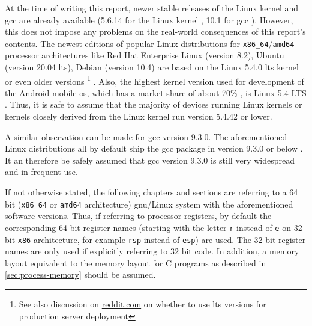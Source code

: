 At the time of writing this report, newer stable releases of the Linux kernel and \gls{gcc} are already available (5.6.14 for the Linux kernel \cite{LKO2020a}, 10.1 for \gls{gcc} \cite{FSF2020}).
However, this does not impose any problems on the real-world consequences of this report's contents.
The newest editions of popular Linux distributions for \texttt{x86\_64}/\texttt{amd64} processor architectures like Red Hat Enterprise Linux (version 8.2), Ubuntu (version 20.04 \gls{lts}), Debian (version 10.4) are based on the Linux 5.4.0 \gls{lts} kernel or even older versions%
	\footnote{See also discussion on \href{https://www.reddit.com/r/webhosting/comments/beg0z0/should_i_use_an_lts_version_of_ubuntu_for_my_web/}{reddit.com} on whether to use \gls{lts} versions for production server deployment}
\cite{RedHat2020,Canonical2020,SPI2020,SPI2020a}.
Also, the highest kernel version used for development of the Android mobile \gls{os}, which has a market share of about 70\% \cite{Statcounter2020}, is Linux 5.4 LTS \cite{GoogleLLC2020}.
Thus, it is safe to assume that the majority of devices running Linux kernels or kernels closely derived from the Linux kernel run version 5.4.42 or lower.

A similar observation can be made for \gls{gcc} version 9.3.0.
The aforementioned Linux distributions all by default ship the \gls{gcc} package in version 9.3.0 or below \cite{RedHat2020a,Canonical2020a,SPI2020b}.
It an therefore be safely assumed that \gls{gcc} version 9.3.0 is still very widespread and in frequent use.

If not otherwise stated, the following chapters and sections are referring to a 64 bit (\texttt{x86\_64} or \texttt{amd64} architecture) \acrshort{gnu}/Linux system with the aforementioned software versions.
Thus, if referring to processor registers, by default the corresponding 64 bit register names (starting with the letter \texttt{r} instead of \texttt{e} on 32 bit \texttt{x86} architecture, for example \texttt{rsp} instead of \texttt{esp}) are used.
The 32 bit register names are only used if explicitly referring to 32 bit code.
In addition, a memory layout equivalent to the memory layout for C programs as described in \cref{sec:process-memory} should be assumed.
